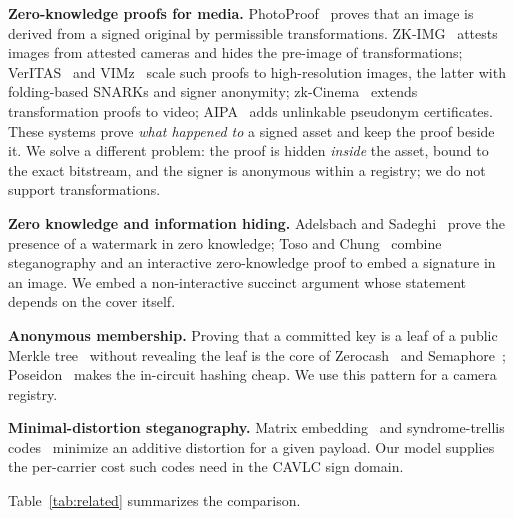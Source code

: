 \textbf{Zero-knowledge proofs for media.} PhotoProof~\cite{photoproof2016} proves that an image is derived from a signed original by permissible transformations. ZK-IMG~\cite{zkimg2022} attests images from attested cameras and hides the pre-image of transformations; VerITAS~\cite{veritas2024} and VIMz~\cite{vimz2024} scale such proofs to high-resolution images, the latter with folding-based SNARKs and signer anonymity; zk-Cinema~\cite{zkcinema2026} extends transformation proofs to video; AIPA~\cite{aipa2026} adds unlinkable pseudonym certificates. These systems prove \emph{what happened to} a signed asset and keep the proof beside it. We solve a different problem: the proof is hidden \emph{inside} the asset, bound to the exact bitstream, and the signer is anonymous within a registry; we do not support transformations.

\textbf{Zero knowledge and information hiding.} Adelsbach and Sadeghi~\cite{adelsbach2001zkwm} prove the presence of a watermark in zero knowledge; Toso and Chung~\cite{toso2006} combine steganography and an interactive zero-knowledge proof to embed a signature in an image. We embed a non-interactive succinct argument whose statement depends on the cover itself.

\textbf{Anonymous membership.} Proving that a committed key is a leaf of a public Merkle tree~\cite{merkle1987} without revealing the leaf is the core of Zerocash~\cite{zerocash2014} and Semaphore~\cite{semaphore}; Poseidon~\cite{poseidon2021} makes the in-circuit hashing cheap. We use this pattern for a camera registry.

\textbf{Minimal-distortion steganography.} Matrix embedding~\cite{westfeld2001f5} and syndrome-trellis codes~\cite{filler2011stc,fridrich2007practical} minimize an additive distortion for a given payload. Our model supplies the per-carrier cost such codes need in the CAVLC sign domain.

Table~\ref{tab:related} summarizes the comparison.

